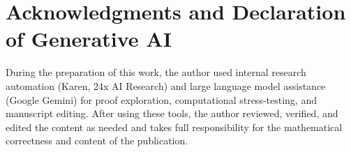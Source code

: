 \documentclass[11pt]{article}
\theoremstyle{remark}
\begin{document}
\section*{Acknowledgments and Declaration of Generative AI}

During the preparation of this work, the author used internal research automation (Karen, 24x AI Research) and large language model assistance (Google Gemini) for proof exploration, computational stress-testing, and manuscript editing. After using these tools, the author reviewed, verified, and edited the content as needed and takes full responsibility for the mathematical correctness and content of the publication.



\end{document}
